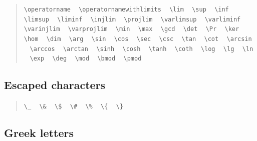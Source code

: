 \documentclass{article}
\newcommand{\texcommand}[1]{\textbackslash{}#1}
\newcommand{\spacer}{\,\,\, \hfil}
\newcommand{\lastspacer}{\hfill\hfill\hfill}
\newenvironment{mylist}{\begin{quote}}{\end{quote}}
\begin{document}
\begin{mylist}
\texttt{\texcommand{operatorname}} \spacer
\texttt{\texcommand{operatornamewithlimits}} \spacer
\texttt{\texcommand{lim}} \spacer
\texttt{\texcommand{sup}} \spacer
\texttt{\texcommand{inf}} \spacer
\texttt{\texcommand{limsup}} \spacer
\texttt{\texcommand{liminf}} \spacer
\texttt{\texcommand{injlim}} \spacer
\texttt{\texcommand{projlim}} \spacer
\texttt{\texcommand{varlimsup}} \spacer
\texttt{\texcommand{varliminf}} \spacer
\texttt{\texcommand{varinjlim}} \spacer
\texttt{\texcommand{varprojlim}} \spacer
\texttt{\texcommand{min}} \spacer
\texttt{\texcommand{max}} \spacer
\texttt{\texcommand{gcd}} \spacer
\texttt{\texcommand{det}} \spacer
\texttt{\texcommand{Pr}} \spacer
\texttt{\texcommand{ker}} \spacer
\texttt{\texcommand{hom}} \spacer
\texttt{\texcommand{dim}} \spacer
\texttt{\texcommand{arg}} \spacer
\texttt{\texcommand{sin}} \spacer
\texttt{\texcommand{cos}} \spacer
\texttt{\texcommand{sec}} \spacer
\texttt{\texcommand{csc}} \spacer
\texttt{\texcommand{tan}} \spacer
\texttt{\texcommand{cot}} \spacer
\texttt{\texcommand{arcsin}} \spacer
\texttt{\texcommand{arccos}} \spacer
\texttt{\texcommand{arctan}} \spacer
\texttt{\texcommand{sinh}} \spacer
\texttt{\texcommand{cosh}} \spacer
\texttt{\texcommand{tanh}} \spacer
\texttt{\texcommand{coth}} \spacer
\texttt{\texcommand{log}} \spacer
\texttt{\texcommand{lg}} \spacer
\texttt{\texcommand{ln}} \spacer
\texttt{\texcommand{exp}} \spacer
\texttt{\texcommand{deg}} \spacer
\texttt{\texcommand{mod}} \spacer
\texttt{\texcommand{bmod}} \spacer
\texttt{\texcommand{pmod}} \lastspacer
\end{mylist}

\subsection{Escaped characters}

\begin{mylist}
\texttt{\texcommand{\_}} \spacer
\texttt{\texcommand{\&}} \spacer
\texttt{\texcommand{\$}} \spacer
\texttt{\texcommand{\#}} \spacer
\texttt{\texcommand{\%}} \spacer
\texttt{\texcommand{\{}} \spacer
\texttt{\texcommand{\}}} \lastspacer
\end{mylist}

\subsection{Greek letters}
\end{document}
